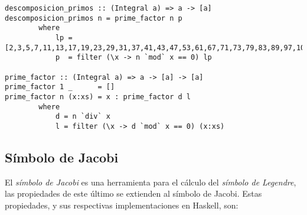 \documentclass[10pt,spanish]{article}
\begin{document}
\begin{verbatim}
descomposicion_primos :: (Integral a) => a -> [a]
descomposicion_primos n = prime_factor n p
        where
            lp = [2,3,5,7,11,13,17,19,23,29,31,37,41,43,47,53,61,67,71,73,79,83,89,97,101]
            p  = filter (\x -> n `mod` x == 0) lp

prime_factor :: (Integral a) => a -> [a] -> [a]
prime_factor 1 _      = []
prime_factor n (x:xs) = x : prime_factor d l
        where
            d = n `div` x
            l = filter (\x -> d `mod` x == 0) (x:xs)
\end{verbatim}

\subsection{\textcolor{rojo}Símbolo de Jacobi}
El \textit{\textcolor{rojo}{símbolo de Jacobi}} es una herramienta para el cálculo del \textit{\textcolor{rojo}{símbolo de Legendre}}, las propiedades de este último se extienden al símbolo de Jacobi. Estas propiedades, y sus respectivas implementaciones en Haskell, son:
\end{document}
